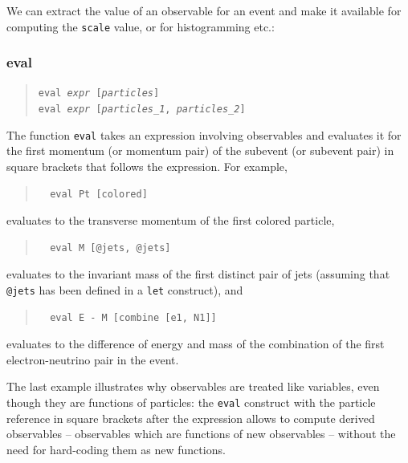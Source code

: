 \documentclass[12pt]{book}
\newcommand{\ttt}[1]{\texttt{#1}}
\begin{document}
We can extract the value of an observable for an event and make it available
for computing the \ttt{scale} value, or for histogramming etc.:

\subsubsection{eval}
\begin{quote}
\begin{footnotesize}
  \ttt{eval \textit{expr} [\textit{particles}]} \\
  \ttt{eval \textit{expr} [\textit{particles\_1}, \textit{particles\_2}]}
\end{footnotesize}
\end{quote}

The function \ttt{eval} takes an expression involving observables and
evaluates it for the first momentum (or momentum pair) of the subevent (or
subevent pair) in square brackets that follows the expression.  For example,
\begin{quote}
\begin{footnotesize}
\begin{verbatim}
  eval Pt [colored]
\end{verbatim}
\end{footnotesize}
\end{quote}
evaluates to the transverse momentum of the first colored particle,
\begin{quote}
\begin{footnotesize}
\begin{verbatim}
  eval M [@jets, @jets]
\end{verbatim}
\end{footnotesize}
\end{quote}
evaluates to the invariant mass of the first distinct pair of jets (assuming
that \verb|@jets| has been defined in a \ttt{let} construct), and
\begin{quote}
\begin{footnotesize}
\begin{verbatim}
  eval E - M [combine [e1, N1]]
\end{verbatim}
\end{footnotesize}
\end{quote}
evaluates to the difference of energy and mass of the combination of the first
electron-neutrino pair in the event.

The last example illustrates why observables are treated like variables, even
though they are functions of particles: the \ttt{eval} construct with the
particle reference in square brackets after the expression allows to compute
derived observables -- observables which are functions of new observables --
without the need for hard-coding them as new functions.
\end{document}
